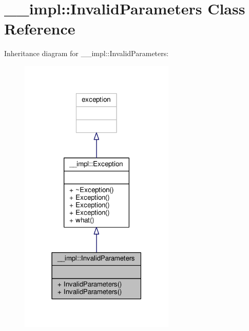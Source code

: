 \hypertarget{class____impl_1_1InvalidParameters}{}\section{\+\_\+\+\_\+impl\+:\+:Invalid\+Parameters Class Reference}
\label{class____impl_1_1InvalidParameters}


Inheritance diagram for \+\_\+\+\_\+impl\+:\+:Invalid\+Parameters\+:
\nopagebreak
\begin{figure}[H]
\begin{center}
\leavevmode
\includegraphics[width=210pt]{d3/d52/class____impl_1_1InvalidParameters__inherit__graph}
\end{center}
\end{figure}


